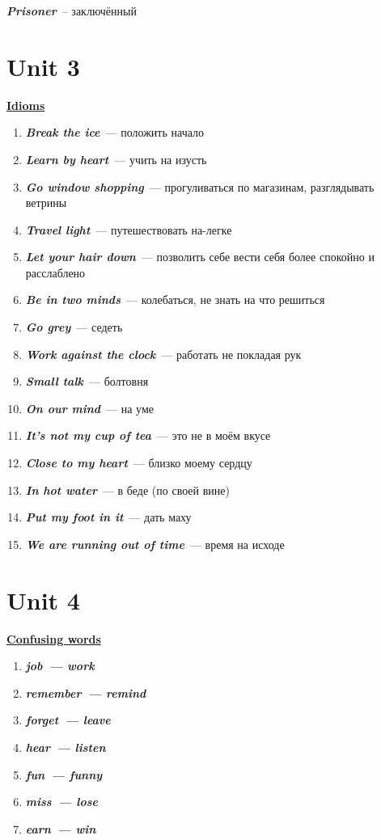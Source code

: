 \documentclass[10pt,a4paper]{article}
\begin{document}
\textit{\textbf{Prisoner}}~-- заключённый





\section{Unit 3}
\textbf{\underline{Idioms}}

\begin{enumerate}
 \item \textit{\textbf{Break the ice}}~--- положить начало 
 \item \textit{\textbf{Learn by heart}}~--- учить на изусть
 \item \textit{\textbf{Go window shopping}}~--- прогуливаться по магазинам, разглядывать ветрины
 \item \textit{\textbf{Travel light}}~--- путешествовать на-легке
 \item \textit{\textbf{Let your hair down}}~--- позволить себе вести себя более спокойно и расслаблено
 \item \textit{\textbf{Be in two minds}}~--- колебаться, не знать на что решиться
 \item \textit{\textbf{Go grey}}~--- седеть
 \item \textit{\textbf{Work against the clock}}~--- работать не покладая рук
 \item \textit{\textbf{Small talk}}~--- болтовня
 \item \textit{\textbf{On our mind}}~--- на уме
 \item \textit{\textbf{It's not my cup of tea}}~--- это не в моём вкусе
 \item \textit{\textbf{Close to my heart}}~--- близко моему сердцу
 \item \textit{\textbf{In hot water}}~--- в беде (по своей вине)
 \item \textit{\textbf{Put my foot in it}}~--- дать маху
 \item \textit{\textbf{We are running out of time}}~--- время на исходе
\end{enumerate}

 
 


\section{Unit 4}

\textbf{\underline{Confusing words}}
\begin{enumerate}
  \item \textit{\textbf{job~--- work}}
  \item \textit{\textbf{remember~--- remind}}
  \item \textit{\textbf{forget~--- leave}}
  \item \textit{\textbf{hear~--- listen}}
  \item \textit{\textbf{fun~--- funny}}
  \item \textit{\textbf{miss~--- lose}}
  \item \textit{\textbf{earn~--- win}}
\end{enumerate}
\end{document}
